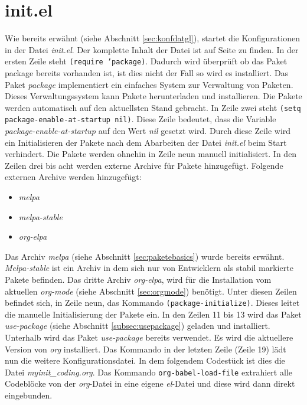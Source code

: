 \section{init.el}
\label{sec:initel}
Wie bereits erwähnt (siehe Abschnitt \ref{sec:konfdatgl}), startet die
Konfigurationen in der Datei \textit{init.el}. Der komplette Inhalt
der Datei ist auf Seite \pageref{code:initel} zu finden. In der ersten
Zeile steht \texttt{(require 'package)}. Dadurch wird überprüft ob das
Paket {\glqq}package{\grqq} bereits vorhanden ist, ist dies nicht der
Fall so wird es installiert. Das Paket \textit{package} implementiert
ein einfaches System zur Verwaltung von Paketen. Dieses
Verwaltungssystem kann Pakete herunterladen und installieren. Die
Pakete werden automatisch auf den aktuellsten Stand gebracht. In Zeile
zwei steht \texttt{(setq package-enable-at-startup nil)}. Diese Zeile
bedeutet, dass die Variable \textit{package-enable-at-startup} auf den
Wert \textit{nil} gesetzt wird. Durch diese Zeile wird ein
Initialisieren der Pakete nach dem Abarbeiten der Datei
\textit{init.el} beim Start verhindert. Die Pakete werden ohnehin in
Zeile neun manuell initialisiert. In den Zeilen drei bis acht werden
externe Archive für Pakete hinzugefügt.  Folgende externen Archive
werden hinzugefügt:
\begin{itemize}
\item \textit{melpa}
\item \textit{melpa-stable}
\item \textit{org-elpa}
\end{itemize}
Das Archiv \textit{melpa} (siehe Abschnitt \ref{sec:paketebasics})
wurde bereits erwähnt. \textit{Melpa-stable} ist ein Archiv in dem
sich nur von Entwicklern als stabil markierte Pakete befinden. Das
dritte Archiv \textit{org-elpa}, wird für die Installation vom
aktuellen \textit{org-mode} (siehe Abschnitt \ref{sec:orgmode})
benötigt. Unter diesen Zeilen befindet sich, in Zeile neun, das
Kommando \texttt{(package-initialize)}. Dieses leitet die manuelle
Initialisierung der Pakete ein. In den Zeilen 11 bis 13 wird das Paket
\textit{use-package} (siehe Abschnitt \ref{subsec:usepackage}) geladen
und installiert. Unterhalb wird das Paket \textit{use-package} bereits
verwendet. Es wird die aktuellere Version von \textit{org}
installiert. Das Kommando in der letzten Zeile (Zeile 19) lädt nun die
weitere Konfigurationsdatei. In dem folgendem Codestück ist dies die
Datei \textit{myinit\_coding.org}. Das Kommando
\texttt{org-babel-load-file} extrahiert alle Codeblöcke von der
\textit{org}-Datei in eine eigene \textit{el}-Datei und diese wird
dann direkt eingebunden.\\

